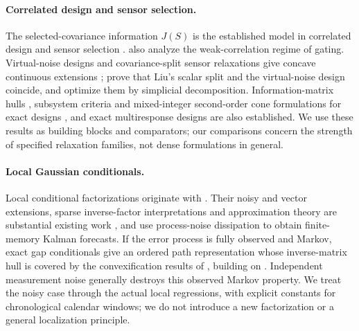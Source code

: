 \paragraph{Correlated design and sensor selection.}
The selected-covariance information $J(S)$ is the established model in
correlated design and sensor selection \citep{Patan2007,Liu2016,Pazman2022}.
\citet{Liu2016} also analyze the weak-correlation regime of gating. Virtual-noise designs and covariance-split sensor
relaxations give concave continuous extensions \citep{Liu2016,Pazman2022};
\citet[Proposition 3]{Hainy2025} prove that Liu's scalar split and the
virtual-noise design coincide, and optimize them by simplicial decomposition. Information-matrix hulls
\citep{HarmanTrnovska2009}, subsystem criteria and mixed-integer
second-order cone formulations for exact designs \citep{Sagnol2015}, and
exact multiresponse designs \citep{Filova2026} are also established. We use
these results as building blocks and comparators; our comparisons concern
the strength of specified relaxation families, not dense formulations in
general.

\paragraph{Local Gaussian conditionals.}
Local conditional factorizations originate with \citet{Vecchia1988}. Their
noisy and vector extensions, sparse inverse-factor interpretations and
approximation theory are substantial existing work
\citep{KatzfussGuinness2021,Schafer2021,Huan2025,KaminetzWebber2026}, and
\citet{Kozdoba2019} use process-noise dissipation to obtain finite-memory
Kalman forecasts. If the error process is fully observed and Markov, exact
gap conditionals give an ordered path representation whose inverse-matrix
hull is covered by the convexification results of \citet{Lee2026}, building
on \citet{Wei2023}. Independent measurement noise generally destroys this
observed Markov property. We treat the noisy case through the actual local
regressions, with explicit constants for chronological calendar windows; we
do not introduce a new factorization or a general localization principle.

